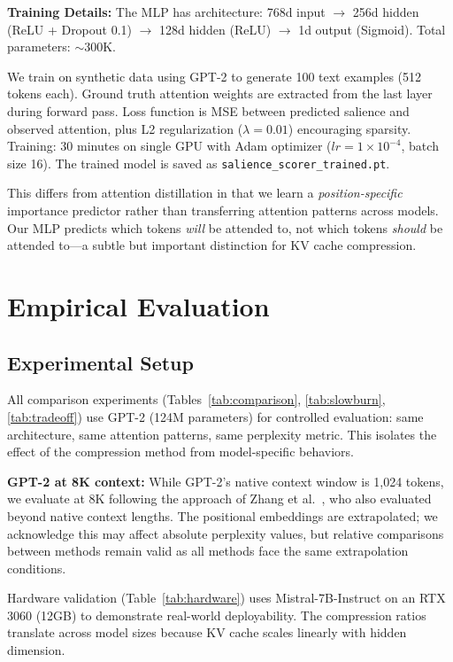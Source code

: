\documentclass[11pt]{article}
\begin{document}
\textbf{Training Details:} The MLP has architecture: 768d input $\rightarrow$ 256d hidden (ReLU + Dropout 0.1) $\rightarrow$ 128d hidden (ReLU) $\rightarrow$ 1d output (Sigmoid). Total parameters: $\sim$300K.

We train on synthetic data using GPT-2 to generate 100 text examples (512 tokens each). Ground truth attention weights are extracted from the last layer during forward pass. Loss function is MSE between predicted salience and observed attention, plus L2 regularization ($\lambda=0.01$) encouraging sparsity. Training: 30 minutes on single GPU with Adam optimizer ($lr=1\times10^{-4}$, batch size 16). The trained model is saved as \texttt{salience\_scorer\_trained.pt}.

This differs from attention distillation\cite{distillation} in that we learn a \textit{position-specific} importance predictor rather than transferring attention patterns across models. Our MLP predicts which tokens \textit{will} be attended to, not which tokens \textit{should} be attended to---a subtle but important distinction for KV cache compression.

\section{Empirical Evaluation}

\subsection{Experimental Setup}

All comparison experiments (Tables~\ref{tab:comparison}, \ref{tab:slowburn}, \ref{tab:tradeoff}) use GPT-2 (124M parameters) for controlled evaluation: same architecture, same attention patterns, same perplexity metric. This isolates the effect of the compression method from model-specific behaviors.

\textbf{GPT-2 at 8K context:} While GPT-2's native context window is 1,024 tokens, we evaluate at 8K following the approach of Zhang et al.~\cite{h2o}, who also evaluated beyond native context lengths. The positional embeddings are extrapolated; we acknowledge this may affect absolute perplexity values, but relative comparisons between methods remain valid as all methods face the same extrapolation conditions.

Hardware validation (Table~\ref{tab:hardware}) uses Mistral-7B-Instruct on an RTX 3060 (12GB) to demonstrate real-world deployability. The compression ratios translate across model sizes because KV cache scales linearly with hidden dimension.
\end{document}

